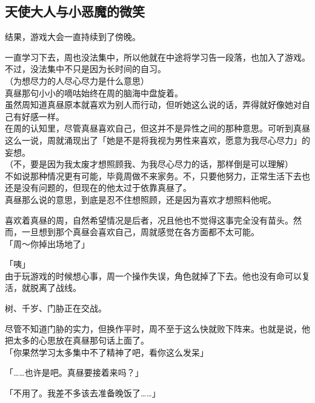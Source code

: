 \subsection{天使大人与小恶魔的微笑}

结果，游戏大会一直持续到了傍晚。

一直学习下去，周也没法集中，所以他就在中途将学习告一段落，也加入了游戏。不过，没法集中不只是因为长时间的自习。\\

（为想尽力的人尽心尽力是什么意思）\\

真昼那句小小的嘀咕始终在周的脑海中盘旋着。\\

虽然周知道真昼原本就喜欢为别人而行动，但听她这么说的话，弄得就好像她对自己有好感一样。\\

在周的认知里，尽管真昼喜欢自己，但这并不是异性之间的那种意思。可听到真昼这么一说，周就涌现出了「她是不是将我视为男性来喜欢，愿意为我尽心尽力」的妄想。\\

（不，要是因为我太废才想照顾我、为我尽心尽力的话，那样倒是可以理解）\\

不如说那种情况更有可能，毕竟周做不来家务。不，只要他努力，正常生活下去也还是没有问题的，但现在的他太过于依靠真昼了。\\

真昼那么说的意思，到底是忍不住想照顾，还是因为喜欢才想照料他呢。

喜欢着真昼的周，自然希望情况是后者，况且他也不觉得这事完全没有苗头。然而，一旦想到那个真昼会喜欢自己，周就感觉在各方面都不太可能。\\

「周～你掉出场地了」

「咦」\\

由于玩游戏的时候想心事，周一个操作失误，角色就掉了下去。他也没有命可以复活，就脱离了战线。

树、千岁、门胁正在交战。

尽管不知道门胁的实力，但换作平时，周不至于这么快就败下阵来。也就是说，他把太多的心思放在真昼那句话上面了。\\

「你果然学习太多集中不了精神了吧，看你这么发呆」

「……也许是吧。真昼要接着来吗？」

「不用了。我差不多该去准备晚饭了……」\\

